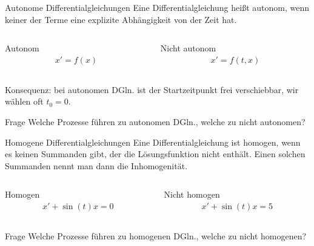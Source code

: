 \documentclass[notheorems,hidelinks,aspectratio=1610]{beamer}
\begin{document}
\begin{frame}
  \begin{block}{Autonome Differentialgleichungen}
    Eine Differentialgleichung heißt autonom, wenn keiner der Terme
    eine explizite Abhängigkeit von der Zeit hat.
  \end{block}
  \begin{columns}
    \begin{column}[t]{.5\textwidth}
      \begin{block}{Autonom}
        \begin{gather*}
          x' = f(x)
        \end{gather*}
      \end{block}
    \end{column}
    \begin{column}[t]{.5\textwidth}
      \begin{block}{Nicht autonom}
        \begin{gather*}
          x' = f(t,x)
        \end{gather*}
      \end{block}
    \end{column}
  \end{columns}
  \pause Konsequenz: bei autonomen DGln. ist der Startzeitpunkt frei
  verschiebbar, wir wählen oft $t_0 = 0$.
  \begin{exampleblock}{Frage}
    Welche Prozesse führen zu autonomen DGln., welche zu nicht autonomen?
  \end{exampleblock}
\end{frame}

\begin{frame}
  \begin{block}{Homogene Differentialgleichungen}
    Eine Differentialgleichung ist homogen, wenn es keinen Summanden
    gibt, der die Lösungsfunktion nicht enthält. Einen solchen
    Summanden nennt man dann die Inhomogenität.
  \end{block}
  \begin{columns}
    \begin{column}[t]{.5\textwidth}
      \begin{block}{Homogen}
        \begin{gather*}
          x'+ \sin(t) x = 0
        \end{gather*}
      \end{block}
    \end{column}
    \begin{column}[t]{.5\textwidth}
      \begin{block}{Nicht homogen}
        \begin{gather*}
          x'+ \sin(t) x = 5
        \end{gather*}
      \end{block}
    \end{column}
  \end{columns}
  \begin{exampleblock}{Frage}
    Welche Prozesse führen zu homogenen DGln., welche zu nicht homogenen?
  \end{exampleblock}
\end{frame}
\end{document}
